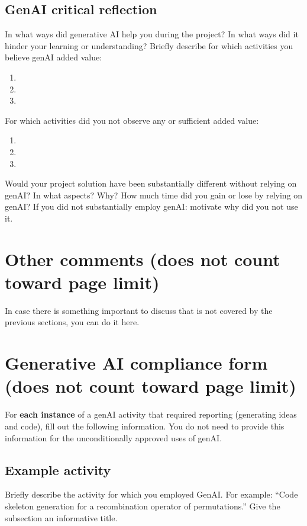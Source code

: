 \documentclass[a4paper,10pt]{article}
\newcommand{\ReplaceMe}[1]{{\color{blue}#1}}
\newcommand{\RemoveMe}[1]{{\color{purple}#1}}
\begin{document}
\subsection{GenAI critical reflection}
\ReplaceMe{In what ways did generative AI help you during the project? In what ways did it hinder your learning or understanding?
Briefly describe for which activities you believe genAI added value:
\begin{enumerate}
 \item 
 \item
 \item
\end{enumerate}
For which activities did you not observe any or sufficient added value:
\begin{enumerate}
 \item 
 \item
 \item
\end{enumerate}
}

\ReplaceMe{Would your project solution have been substantially different without relying on genAI? In what aspects? Why? How much time did you gain or lose by relying on genAI? If you did not substantially employ genAI: motivate why did you not use it.}


\clearpage
\section{Other comments \hfill(does not count toward page limit)} \label{sec_other}

\ReplaceMe{In case there is something important to discuss that is not covered by the previous sections, you can do it here. }

\section{Generative AI compliance form \hfill(does not count toward page limit)} \label{sec_genai}

\RemoveMe{For \textbf{each instance} of a genAI activity that required reporting (generating ideas and code), fill out the following information. You do not need to provide this information for the unconditionally approved uses of genAI.}

\subsection{Example activity} \ReplaceMe{Briefly describe the activity for which you employed GenAI. For example: ``Code skeleton generation for a recombination operator of permutations.'' Give the subsection an informative title.}
\end{document}
